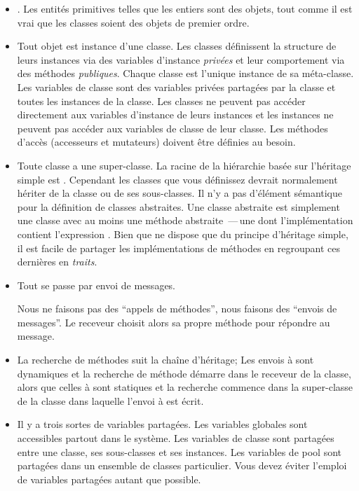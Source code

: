 \documentclass[a4paper,10pt,twoside]{book}
\begin{document}
\begin{itemize}

  \item \Mantra.
  Les entités primitives telles que les entiers sont des objets, tout comme
il est vrai que les classes soient des objets de premier ordre.

  \item Tout objet est instance d'une classe.
Les classes définissent la structure de leurs instances via des
variables d'instance \emph{privées} et leur comportement 
via des méthodes \emph{publiques}. Chaque classe est l'unique
instance de sa méta-classe.
Les variables de classe sont des variables privées partagées par la classe
et toutes les instances de la classe.
Les classes ne peuvent pas accéder directement aux variables d'instance de
leurs instances et les instances ne peuvent pas accéder aux variables de
classe de leur classe.
Les méthodes d'accès (accesseurs et mutateurs) doivent être
définies au besoin.  

  \item Toute classe a une super-classe.
  La racine de la hiérarchie basée sur l'héritage simple est .
	Cependant les classes que vous définissez devrait normalement hériter de la classe  ou de ses sous-classes.
Il n'y a pas d'élément sémantique pour la définition de classes abstraites.
Une classe abstraite est simplement une classe avec au moins une méthode abstraite
\,---\,une dont l'implémentation contient l'expression 
.
  Bien que \pharo ne dispose que du principe d'héritage simple, 
il est facile de partager les implémentations de méthodes
en regroupant ces dernières en \emph{traits}.

  \item Tout se passe par envoi de messages. %

	Nous ne faisons pas des ``appels de méthodes'', nous faisons des ``envois de messages''.
        Le receveur choisit alors sa propre méthode pour répondre au message.

  \item La recherche de méthodes suit la chaîne d'héritage;
        Les envois à \self sont dynamiques et la recherche de méthode
        démarre dans le receveur de la classe, alors que
        celles à \super sont statiques et la recherche commence dans la super-classe de la 
        classe dans laquelle l'envoi à \super est écrit.

  \item Il y a trois sortes de variables partagées.
        Les variables globales sont accessibles partout dans le système.
        Les variables de classe sont partagées entre une classe, ses sous-classes et ses instances.
        Les variables de pool sont partagées dans un ensemble de classes particulier.
        Vous devez éviter l'emploi de variables partagées autant que possible.

\end{itemize}

\ifx\wholebook\relax\else
   
   
\end{document}
